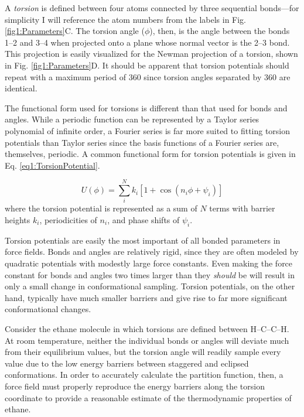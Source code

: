 A \emph{torsion} is defined between four atoms connected by three sequential
bonds---for simplicity I will reference the atom numbers from the labels in Fig.
\ref{fig1:Parameters}C. The torsion angle ($\phi$), then, is the angle between
the bonds 1--2 and 3--4 when projected onto a plane whose normal vector is the
2--3 bond.  This projection is easily visualized for the Newman projection of a
torsion, shown in Fig. \ref{fig1:Parameters}D. It should be apparent that
torsion potentials should repeat with a maximum period of 360\textdegree{} since
torsion angles separated by 360\textdegree{} are identical.

The functional form used for torsions is different than that used for bonds and
angles. While a periodic function can be represented by a Taylor series
polynomial of infinite order, a Fourier series is far more suited to fitting
torsion potentials than Taylor series since the basis functions of a Fourier
series are, themselves, periodic. A common functional form for torsion
potentials is given in Eq. \ref{eq1:TorsionPotential}.
\cite{Cramer_Book_EssentialsCompChem_2004}

\begin{equation}
   U(\phi) = \sum_i^N k _ i \left [ 1 + \cos \left ( n_i \phi + \psi _ i \right )
             \right ]
   \label{eq1:TorsionPotential}
\end{equation}
where the torsion potential is represented as a sum of $N$ terms with barrier
heights $k_i$, periodicities of $n_i$, and phase shifts of $\psi _ i$.

Torsion potentials are easily the most important of all bonded parameters in
force fields. Bonds and angles are relatively rigid, since they are often
modeled by quadratic potentials with modestly large force constants. Even making
the force constant for bonds and angles two times larger than they \emph{should}
be will result in only a small change in conformational sampling. Torsion
potentials, on the other hand, typically have much smaller barriers and give
rise to far more significant conformational changes.

Consider the ethane molecule in which torsions are defined between H--C--C--H.
At room temperature, neither the individual bonds or angles will deviate much
from their equilibrium values, but the torsion angle will readily sample every
value due to the low energy barriers between staggered and eclipsed
conformations. In order to accurately calculate the partition function, then, a
force field must properly reproduce the energy barriers along the torsion
coordinate to provide a reasonable estimate of the thermodynamic properties of
ethane.

